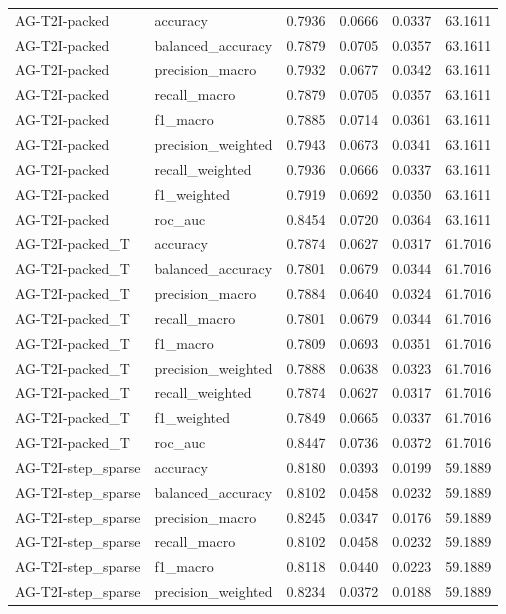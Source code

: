 \begin{tabular}{llrrrr}
AG-T2I-packed & accuracy & 0.7936 & 0.0666 & 0.0337 & 63.1611 \\
AG-T2I-packed & balanced_accuracy & 0.7879 & 0.0705 & 0.0357 & 63.1611 \\
AG-T2I-packed & precision_macro & 0.7932 & 0.0677 & 0.0342 & 63.1611 \\
AG-T2I-packed & recall_macro & 0.7879 & 0.0705 & 0.0357 & 63.1611 \\
AG-T2I-packed & f1_macro & 0.7885 & 0.0714 & 0.0361 & 63.1611 \\
AG-T2I-packed & precision_weighted & 0.7943 & 0.0673 & 0.0341 & 63.1611 \\
AG-T2I-packed & recall_weighted & 0.7936 & 0.0666 & 0.0337 & 63.1611 \\
AG-T2I-packed & f1_weighted & 0.7919 & 0.0692 & 0.0350 & 63.1611 \\
AG-T2I-packed & roc_auc & 0.8454 & 0.0720 & 0.0364 & 63.1611 \\
AG-T2I-packed_T & accuracy & 0.7874 & 0.0627 & 0.0317 & 61.7016 \\
AG-T2I-packed_T & balanced_accuracy & 0.7801 & 0.0679 & 0.0344 & 61.7016 \\
AG-T2I-packed_T & precision_macro & 0.7884 & 0.0640 & 0.0324 & 61.7016 \\
AG-T2I-packed_T & recall_macro & 0.7801 & 0.0679 & 0.0344 & 61.7016 \\
AG-T2I-packed_T & f1_macro & 0.7809 & 0.0693 & 0.0351 & 61.7016 \\
AG-T2I-packed_T & precision_weighted & 0.7888 & 0.0638 & 0.0323 & 61.7016 \\
AG-T2I-packed_T & recall_weighted & 0.7874 & 0.0627 & 0.0317 & 61.7016 \\
AG-T2I-packed_T & f1_weighted & 0.7849 & 0.0665 & 0.0337 & 61.7016 \\
AG-T2I-packed_T & roc_auc & 0.8447 & 0.0736 & 0.0372 & 61.7016 \\
AG-T2I-step_sparse & accuracy & 0.8180 & 0.0393 & 0.0199 & 59.1889 \\
AG-T2I-step_sparse & balanced_accuracy & 0.8102 & 0.0458 & 0.0232 & 59.1889 \\
AG-T2I-step_sparse & precision_macro & 0.8245 & 0.0347 & 0.0176 & 59.1889 \\
AG-T2I-step_sparse & recall_macro & 0.8102 & 0.0458 & 0.0232 & 59.1889 \\
AG-T2I-step_sparse & f1_macro & 0.8118 & 0.0440 & 0.0223 & 59.1889 \\
AG-T2I-step_sparse & precision_weighted & 0.8234 & 0.0372 & 0.0188 & 59.1889 \\

\end{tabular}
